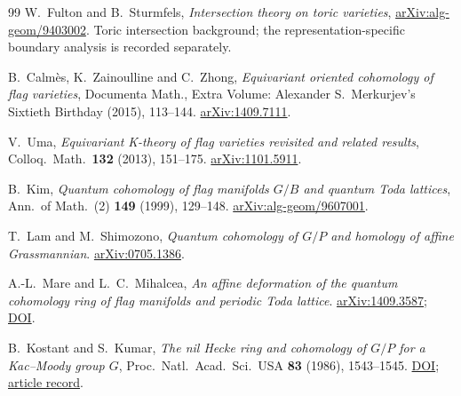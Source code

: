 \documentclass[11pt,letterpaper]{article}
\begin{document}
\begin{thebibliography}{99}
W.~Fulton and B.~Sturmfels, \emph{Intersection theory on toric varieties},
\href{https://arxiv.org/abs/alg-geom/9403002}{arXiv:alg-geom/9403002}.
Toric intersection background; the representation-specific boundary
analysis is recorded separately.

B.~Calm\`es, K.~Zainoulline and C.~Zhong,
\emph{Equivariant oriented cohomology of flag varieties},
Documenta Math., Extra Volume: Alexander S.~Merkurjev's Sixtieth Birthday
(2015), 113--144.
\href{https://arxiv.org/abs/1409.7111}{arXiv:1409.7111}.

V.~Uma, \emph{Equivariant K-theory of flag varieties revisited and
related results}, Colloq.\ Math.\ \textbf{132} (2013), 151--175.
\href{https://arxiv.org/abs/1101.5911}{arXiv:1101.5911}.

B.~Kim, \emph{Quantum cohomology of flag manifolds \(G/B\) and quantum
Toda lattices}, Ann.\ of Math.\ (2) \textbf{149} (1999), 129--148.
\href{https://arxiv.org/abs/alg-geom/9607001}{arXiv:alg-geom/9607001}.

T.~Lam and M.~Shimozono, \emph{Quantum cohomology of \(G/P\) and homology
of affine Grassmannian}.
\href{https://arxiv.org/abs/0705.1386}{arXiv:0705.1386}.

A.-L.~Mare and L.~C.~Mihalcea,
\emph{An affine deformation of the quantum cohomology ring of flag
manifolds and periodic Toda lattice}.
\href{https://arxiv.org/abs/1409.3587}{arXiv:1409.3587};
\href{https://doi.org/10.1112/plms.12077}{DOI}.

B.~Kostant and S.~Kumar, \emph{The nil Hecke ring and cohomology of
\(G/P\) for a Kac--Moody group \(G\)}, Proc.\ Natl.\ Acad.\ Sci.\ USA
\textbf{83} (1986), 1543--1545.
\href{https://doi.org/10.1073/pnas.83.6.1543}{DOI};
\href{https://pubmed.ncbi.nlm.nih.gov/16593661/}{article record}.
\end{thebibliography}
\end{document}
